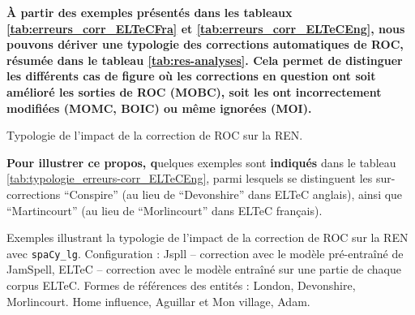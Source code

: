 \textbf{À partir des exemples présentés dans les tableaux \ref{tab:erreurs_corr_ELTeCFra} et \ref{tab:erreurs_corr_ELTeCEng}, nous pouvons dériver une typologie des corrections automatiques de ROC, résumée dans le tableau \ref{tab:res-analyses}. Cela permet de distinguer les différents cas de figure où les corrections en question ont soit amélioré les sorties de ROC (MOBC), soit les ont incorrectement modifiées (MOMC, BOIC) ou même ignorées (MOI).}

\begin{table}[h!]
\small
    \centering
    
    \caption{Typologie de l'impact de la correction de ROC sur la REN.  }
    \label{tab:res-analyses}
\end{table}

\textbf{Pour illustrer ce propos, q}uelques exemples sont \textbf{indiqués} dans le tableau \ref{tab:typologie_erreurs-corr_ELTeCEng}, 
parmi lesquels se distinguent les sur-corrections ``Conspire'' 
(au lieu de ``Devonshire'' 
dans ELTeC anglais), ainsi que ``Martincourt'' (au lieu de ``Morlincourt'' dans ELTeC français).

\begin{table}[h!]
\small
    \centering
   
    \caption{Exemples illustrant la typologie de l'impact de la correction de ROC sur la REN avec \texttt{spaCy\_lg}. Configuration : Jspll -- correction avec le modèle pré-entraîné de JamSpell, ELTeC -- correction avec le modèle entraîné sur une partie de chaque corpus ELTeC. Formes de références des entités : London, Devonshire, Morlincourt. {\normalfont Home influence}, Aguillar et {\normalfont Mon village}, Adam.}
    \label{tab:typologie_erreurs-corr_ELTeCEng}
\end{table}


%    

